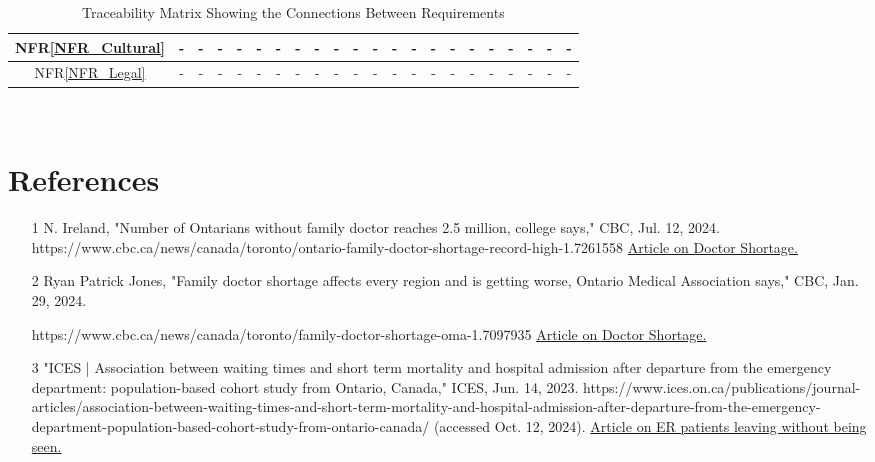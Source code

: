 \documentclass[12pt]{article}
\begin{document}
\begin{itemize}
\begin{landscape}
\begin{table}[H]
\begin{tabular}{|c|c|c|c|c|c|c|c|c|c|c|c|c|c|c|c|c|c|c|c|c|c|}
      NFR\ref{NFR_Cultural} & - & - & - & - & - & - & - & - & - & - & - & - & - & - & - & - & - & - & - & - & - \\ \hline
      NFR\ref{NFR_Legal} & - & - & - & - & - & - & - & - & - & - & - & - & - & - & - & - & - & - & - & - & - \\ \hline
      \end{tabular}
      \caption{Traceability Matrix Showing the Connections Between Requirements}
      \label{Table:A_trace}
      \end{table}
    \end{landscape}

~\newpage

\section{References}
\begin{itemize}
  \item
  [1]N. Ireland, "Number of Ontarians without family doctor reaches 2.5 million, college says," CBC, Jul. 12, 2024. https://www.cbc.ca/news/canada/toronto/ontario-family-doctor-shortage-record-high-1.7261558
  \href{https://www.cbc.ca/news/canada/toronto/ontario-family-doctor-shortage-record-high-1.7261558}{Article on Doctor Shortage.}
  \item 
  [2]Ryan Patrick Jones, "Family doctor shortage affects every region and is getting worse, Ontario Medical Association says," CBC, Jan. 29, 2024.
  
  https://www.cbc.ca/news/canada/toronto/family-doctor-shortage-oma-1.7097935
  \href{https://www.cbc.ca/news/canada/toronto/family-doctor-shortage-oma-1.7097935}{Article on Doctor Shortage.}
  \item
  [3]"ICES | Association between waiting times and short term mortality and hospital admission after departure from the emergency department: population-based cohort study from Ontario, Canada," ICES, Jun. 14, 2023. https://www.ices.on.ca/publications/journal-articles/association-between-waiting-times-and-short-term-mortality-and-hospital-admission-after-departure-from-the-emergency-department-population-based-cohort-study-from-ontario-canada/ (accessed Oct. 12, 2024).
  \href{https://www.ices.on.ca/publications/journal-articles/association-between-waiting-times-and-short-term-mortality-and-hospital-admission-after-departure-from-the-emergency-department-population-based-cohort-study-from-ontario-canada/}{Article on ER patients leaving without being seen.}
\end{itemize}


\end{itemize}
\end{document}
